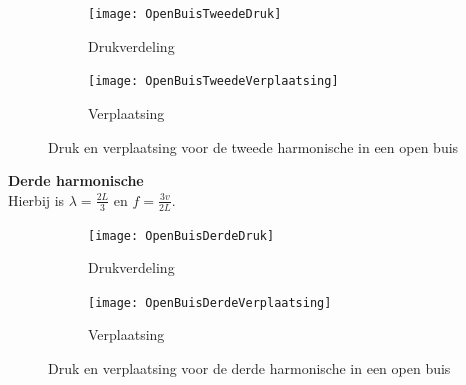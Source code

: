 \documentclass[a4paper,kul]{kulakarticle} %
\begin{document}
\begin{figure}[!h]
	\centering
	\begin{subfigure}{.5\textwidth}
		\centering
		\texttt{[image: OpenBuisTweedeDruk]}
		\caption{Drukverdeling}
		\label{fig:TweedeBuisDruk}
	\end{subfigure}%
	\begin{subfigure}{.5\textwidth}
		\centering
		\texttt{[image: OpenBuisTweedeVerplaatsing]}
		\caption{Verplaatsing}
		\label{fig:TweedeBuisVerplaatsing}
	\end{subfigure}
	\caption{Druk en verplaatsing voor de tweede harmonische in een open buis}
	\label{fig:OpenBuisTweede}
\end{figure}

\textbf{Derde harmonische}\\
Hierbij is $\lambda = \frac{2L}{3}$ en $f=\frac{3v}{2L}$.

\begin{figure}[!h]
	\centering
	\begin{subfigure}{.5\textwidth}
		\centering
		\texttt{[image: OpenBuisDerdeDruk]}
		\caption{Drukverdeling}
		\label{fig:DerdeBuisDruk}
	\end{subfigure}%
	\begin{subfigure}{.5\textwidth}
		\centering
		\texttt{[image: OpenBuisDerdeVerplaatsing]}
		\caption{Verplaatsing}
		\label{fig:DerdeBuisVerplaatsing}
	\end{subfigure}
	\caption{Druk en verplaatsing voor de derde harmonische in een open buis}
	\label{fig:OpenBuisDerde}
\end{figure}
\newpage
\end{document}
